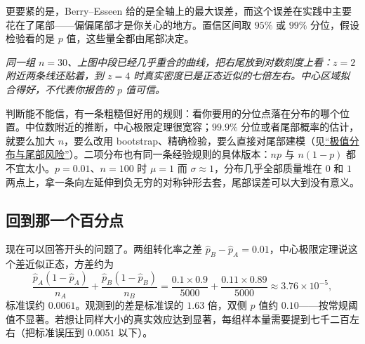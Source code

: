 更要紧的是，Berry--Esseen 给的是全轴上的最大误差，而这个误差在实践中主要花在了尾部——偏偏尾部才是你关心的地方。置信区间取 \(95\%\) 或 \(99\%\) 分位，假设检验看的是 \(p\) 值，这些量全都由尾部决定。

\begin{center}

\emph{同一组 \(n=30\)、上图中段已经几乎重合的曲线，把右尾放到对数刻度上看：\(z=2\) 附近两条线还贴着，到 \(z=4\) 时真实密度已是正态近似的七倍左右。中心区域拟合得好，不代表你报告的 \(p\) 值可信。}
\end{center}

判断能不能信，有一条粗糙但好用的规则：看你要用的分位点落在分布的哪个位置。中位数附近的推断，中心极限定理很宽容；\(99.9\%\) 分位或者尾部概率的估计，就要么加大 \(n\)，要么改用 bootstrap、精确检验，要么直接对尾部建模（见\hyperref[sec:05-Probability/06-Common-Distributions/08]{``极值分布与尾部风险''}）。二项分布也有同一条经验规则的具体版本：\(np\) 与 \(n(1-p)\) 都不宜太小。\(p=0.01\)、\(n=100\) 时 \(\mu=1\) 而 \(\sigma\approx1\)，分布几乎全部质量堆在 \(0\) 和 \(1\) 两点上，拿一条向左延伸到负无穷的对称钟形去套，尾部误差可以大到没有意义。

\subsection{回到那一个百分点}

现在可以回答开头的问题了。两组转化率之差 \(\hat p_B-\hat p_A=0.01\)，中心极限定理说这个差近似正态，方差约为
\[
\frac{\hat p_A(1-\hat p_A)}{n_A}+\frac{\hat p_B(1-\hat p_B)}{n_B}
=\frac{0.1\times0.9}{5000}+\frac{0.11\times0.89}{5000}\approx3.76\times10^{-5},
\]
标准误约 \(0.0061\)。观测到的差是标准误的 \(1.63\) 倍，双侧 \(p\) 值约 \(0.10\)——按常规阈值不显著。若想让同样大小的真实效应达到显著，每组样本量需要提到七千二百左右（把标准误压到 \(0.0051\) 以下）。

